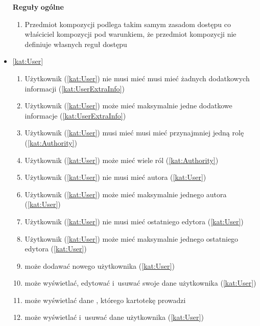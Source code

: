 \begin{itemize}[label={\textbf{Reguły dla}}, wide, labelwidth=!, labelindent=0pt]
    \setlength\itemsep{1em}
    \item[\textbf{Reguły}] \textbf{ogólne}
    \begin{enumerate}[label={\textbf{REG/\protect\threedigits{\arabic{enumi}}}}, wide, labelwidth=!, align=left, leftmargin=3cm]
        \item Przedmiot kompozycji podlega takim samym zasadom dostępu co właściciel kompozycji pod warunkiem, że przedmiot kompozycji nie definiuje własnych reguł dostępu
    \end{enumerate}
    \item\ref{kat:User}
    \begin{enumerate}[label={\textbf{REG/\protect\threedigits{\arabic{enumi}}}}, wide, labelwidth=!, align=left, leftmargin=3cm, resume]
        \item Użytkownik (\ref{kat:User}) nie musi mieć musi mieć żadnych dodatkowych informacji (\ref{kat:UserExtraInfo})
        \item Użytkownik (\ref{kat:User}) może mieć maksymalnie jedne dodatkowe informacje (\ref{kat:UserExtraInfo})
        \item Użytkownik (\ref{kat:User}) musi mieć musi mieć przynajmniej jedną rolę (\ref{kat:Authority})
        \item Użytkownik (\ref{kat:User}) może mieć wiele ról (\ref{kat:Authority})
        \item Użytkownik (\ref{kat:User}) nie musi mieć autora (\ref{kat:User})
        \item Użytkownik (\ref{kat:User}) może mieć maksymalnie jednego autora (\ref{kat:User})
        \item Użytkownik (\ref{kat:User}) nie musi mieć ostatniego edytora (\ref{kat:User})
        \item Użytkownik (\ref{kat:User}) może mieć maksymalnie jednego ostatniego edytora (\ref{kat:User})
        \item {} może dodawać nowego użytkownika (\ref{kat:User})
        \item {} może wyświetlać, edytować i~usuwać swoje dane użytkownika (\ref{kat:User})
        \item {} może wyświetlać dane , którego kartotekę prowadzi
        \item {} może wyświetlać i~usuwać dane użytkownika (\ref{kat:User})

\end{enumerate}
\end{itemize}
